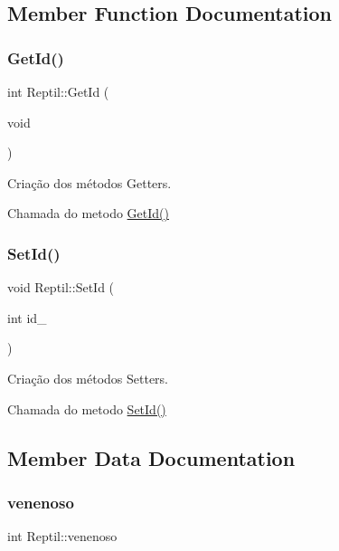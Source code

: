\subsection{Member Function Documentation}
\mbox{\label{class_reptil_af94ef2eb8b24f8751ed83a5f9786684a}} 
\subsubsection{\texorpdfstring{Get\+Id()}{GetId()}}
{\footnotesize\ttfamily int Reptil\+::\+Get\+Id (\begin{DoxyParamCaption}\item[{void}]{ }\end{DoxyParamCaption})}



Criação dos métodos Getters. 

Chamada do metodo \mbox{\hyperlink{class_reptil_af94ef2eb8b24f8751ed83a5f9786684a}{Get\+Id()}} \mbox{\label{class_reptil_a423a8162894755b69a63eefd91ba97a4}} 
\subsubsection{\texorpdfstring{Set\+Id()}{SetId()}}
{\footnotesize\ttfamily void Reptil\+::\+Set\+Id (\begin{DoxyParamCaption}\item[{int}]{id\+\_\+ }\end{DoxyParamCaption})}



Criação dos métodos Setters. 

Chamada do metodo \mbox{\hyperlink{class_reptil_a423a8162894755b69a63eefd91ba97a4}{Set\+Id()}} 

\subsection{Member Data Documentation}
\mbox{\label{class_reptil_ac194e65b0de8ab94dd6ce75e889ba8a8}} 
\subsubsection{\texorpdfstring{venenoso}{venenoso}}
{\footnotesize\ttfamily int Reptil\+::venenoso\hspace{0.3cm}{\ttfamily [protected]}}



